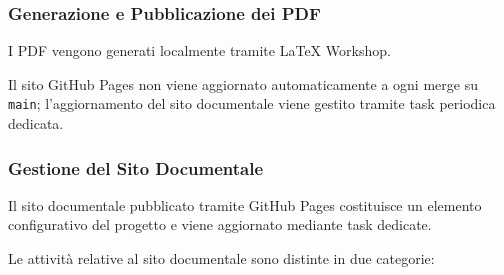 
\subsubsection{Generazione e Pubblicazione dei PDF}

I PDF vengono generati localmente tramite LaTeX Workshop.

Il sito GitHub Pages non viene aggiornato automaticamente a ogni merge su
\texttt{main}; l'aggiornamento del sito documentale viene gestito tramite task
periodica dedicata.


\subsubsection{Gestione del Sito Documentale}

Il sito documentale pubblicato tramite GitHub Pages costituisce un elemento
configurativo del progetto e viene aggiornato mediante task dedicate.

Le attività relative al sito documentale sono distinte in due categorie:

